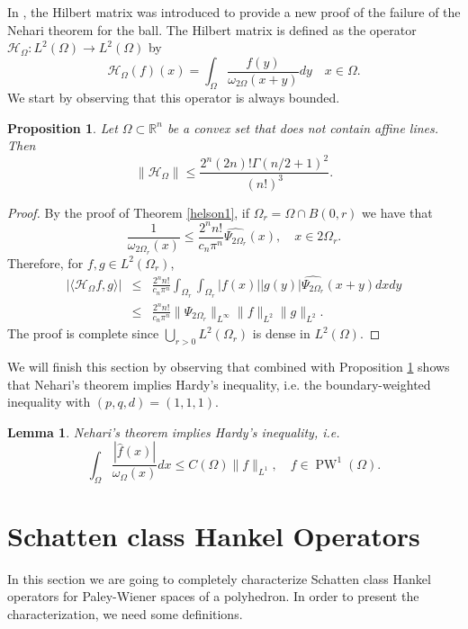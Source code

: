 \documentclass{amsart}
\theoremstyle{plain}
\newtheorem{lm}[theo]{Lemma}
\newtheorem{prop}[theo]{Proposition}
\DeclareMathOperator{\PW}{PW}
\begin{document}
In \cite[Section 7.2]{bampouras2026boundaryweightedfourierinequalitiesconvex}, the Hilbert matrix was introduced to provide a new proof of the failure of the Nehari theorem for the ball. The Hilbert matrix is defined as the operator $\mathcal{H}_\Omega:L^2(\Omega)\to L^2(\Omega)$ by
$$\mathcal{H}_\Omega(f)(x)=\int_\Omega \dfrac{f(y)}{\omega_{2\Omega}(x+y)}dy\quad x\in \Omega.$$
We start by observing that this operator is always bounded.
\begin{prop}\label{Hilbert}
	Let $\Omega\subset\mathbb{R}^n$ be a convex set that does not contain affine lines. Then 
	$$\|\mathcal{H}_\Omega\|\leq\frac{2^n(2n)!\Gamma(n/2+1)^2}{(n!)^3}.$$
\end{prop}
\begin{proof}
	By the proof of Theorem \ref{helson1}, if $\Omega_r=\Omega\cap B(0,r)$ we have that
	$$\frac{1}{\omega_{2\Omega_r}(x)}\leq \frac{2^n n!}{c_n\pi^n}\widehat{\Psi_{2\Omega_r}}(x), \quad x\in 2\Omega_r.$$
	Therefore, for $f,g\in L^2(\Omega_r)$,
	\begin{eqnarray} 
		|\langle \mathcal{H}_\Omega f,g\rangle|& \leq&\frac{2^n n!}{c_n\pi^n} \int_{\Omega_r}\int_{\Omega_r} |f(x)||g(y)|\widehat{\Psi_{2\Omega_r}}(x+y)dxdy \nonumber \\ &\leq& \frac{2^n n!}{c_n\pi^n}\|\Psi_{2\Omega_r}\|_{L^\infty}\|f\|_{L^2}\|g\|_{L^2}.\nonumber 
	\end{eqnarray}
	The proof is complete since $\bigcup_{r>0} L^2(\Omega_r)$ is dense in $L^2(\Omega)$.
\end{proof}

We will finish this section by observing that \cite[Lemma 7.5]{bampouras2026boundaryweightedfourierinequalitiesconvex} combined with Proposition \ref{Hilbert} shows that Nehari's theorem implies Hardy's inequality, i.e. the boundary-weighted inequality with $(p,q,d)=(1,1,1)$.
\begin{lm}
	Nehari's theorem implies Hardy's inequality, i.e.
	$$\int_\Omega\dfrac{|\hat{f}(x)|}{\omega_\Omega(x)}dx\leq C(\Omega)\|f\|_{L^1},\quad f\in \PW^1(\Omega).$$
\end{lm}


\section{Schatten class Hankel Operators}\label{Schatten}
In this section we are going to completely characterize Schatten class Hankel operators for Paley-Wiener spaces of a polyhedron. In order to present the characterization, we need some definitions.
\end{document}
